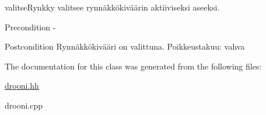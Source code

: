 valitse\-Rynkky valitsee rynnäkkökiväärin aktiiviseksi aseeksi. 

\begin{DoxyPrecond}{Precondition}
-\/ 
\end{DoxyPrecond}
\begin{DoxyPostcond}{Postcondition}
Rynnäkkökivääri on valittuna. Poikkeustakuu\-: vahva 
\end{DoxyPostcond}


The documentation for this class was generated from the following files\-:\begin{DoxyCompactItemize}
\item 
\hyperlink{drooni_8hh}{drooni.\-hh}\item 
drooni.\-cpp\end{DoxyCompactItemize}

